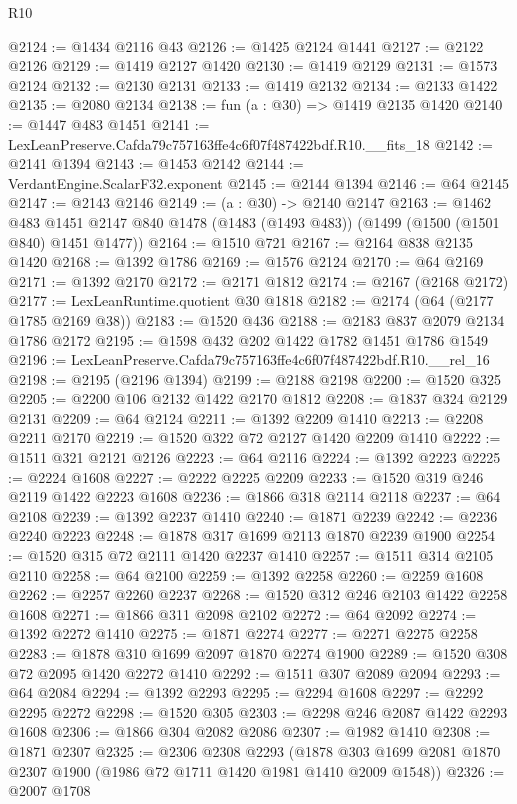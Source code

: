 \begin{lexlean}{R10}
\begin{coremodule}
@2124 := @1434 @2116 @43
@2126 := @1425 @2124 @1441
@2127 := @2122 @2126
@2129 := @1419 @2127 @1420
@2130 := @1419 @2129
@2131 := @1573 @2124
@2132 := @2130 @2131
@2133 := @1419 @2132
@2134 := @2133 @1422
@2135 := @2080 @2134
@2138 := fun (a : @30) => @1419 @2135 @1420
@2140 := @1447 @483 @1451
@2141 := LexLeanPreserve.Cafda79c757163ffe4c6f07f487422bdf.R10.__fits_18
@2142 := @2141 @1394
@2143 := @1453 @2142
@2144 := VerdantEngine.ScalarF32.exponent
@2145 := @2144 @1394
@2146 := @64 @2145
@2147 := @2143 @2146
@2149 := (a : @30) -> @2140 @2147
@2163 := @1462
    @483
    @1451
    @2147
    @840
    @1478
    (@1483 (@1493 @483))
    (@1499 (@1500 (@1501 @840) @1451 @1477))
@2164 := @1510 @721
@2167 := @2164 @838 @2135 @1420
@2168 := @1392 @1786
@2169 := @1576 @2124
@2170 := @64 @2169
@2171 := @1392 @2170
@2172 := @2171 @1812
@2174 := @2167 (@2168 @2172)
@2177 := LexLeanRuntime.quotient @30 @1818
@2182 := @2174 (@64 (@2177 @1785 @2169 @38))
@2183 := @1520 @436
@2188 := @2183 @837 @2079 @2134 @1786 @2172
@2195 := @1598 @432 @202 @1422 @1782 @1451 @1786 @1549
@2196 := LexLeanPreserve.Cafda79c757163ffe4c6f07f487422bdf.R10.__rel_16
@2198 := @2195 (@2196 @1394)
@2199 := @2188 @2198
@2200 := @1520 @325
@2205 := @2200 @106 @2132 @1422 @2170 @1812
@2208 := @1837 @324 @2129 @2131
@2209 := @64 @2124
@2211 := @1392 @2209 @1410
@2213 := @2208 @2211 @2170
@2219 := @1520 @322 @72 @2127 @1420 @2209 @1410
@2222 := @1511 @321 @2121 @2126
@2223 := @64 @2116
@2224 := @1392 @2223
@2225 := @2224 @1608
@2227 := @2222 @2225 @2209
@2233 := @1520 @319 @246 @2119 @1422 @2223 @1608
@2236 := @1866 @318 @2114 @2118
@2237 := @64 @2108
@2239 := @1392 @2237 @1410
@2240 := @1871 @2239
@2242 := @2236 @2240 @2223
@2248 := @1878 @317 @1699 @2113 @1870 @2239 @1900
@2254 := @1520 @315 @72 @2111 @1420 @2237 @1410
@2257 := @1511 @314 @2105 @2110
@2258 := @64 @2100
@2259 := @1392 @2258
@2260 := @2259 @1608
@2262 := @2257 @2260 @2237
@2268 := @1520 @312 @246 @2103 @1422 @2258 @1608
@2271 := @1866 @311 @2098 @2102
@2272 := @64 @2092
@2274 := @1392 @2272 @1410
@2275 := @1871 @2274
@2277 := @2271 @2275 @2258
@2283 := @1878 @310 @1699 @2097 @1870 @2274 @1900
@2289 := @1520 @308 @72 @2095 @1420 @2272 @1410
@2292 := @1511 @307 @2089 @2094
@2293 := @64 @2084
@2294 := @1392 @2293
@2295 := @2294 @1608
@2297 := @2292 @2295 @2272
@2298 := @1520 @305
@2303 := @2298 @246 @2087 @1422 @2293 @1608
@2306 := @1866 @304 @2082 @2086
@2307 := @1982 @1410
@2308 := @1871 @2307
@2325 := @2306
    @2308
    @2293
    (@1878 @303 @1699 @2081 @1870 @2307 @1900 (@1986 @72 @1711 @1420 @1981 @1410 @2009 @1548))
@2326 := @2007 @1708

\end{coremodule}
\end{lexlean}
